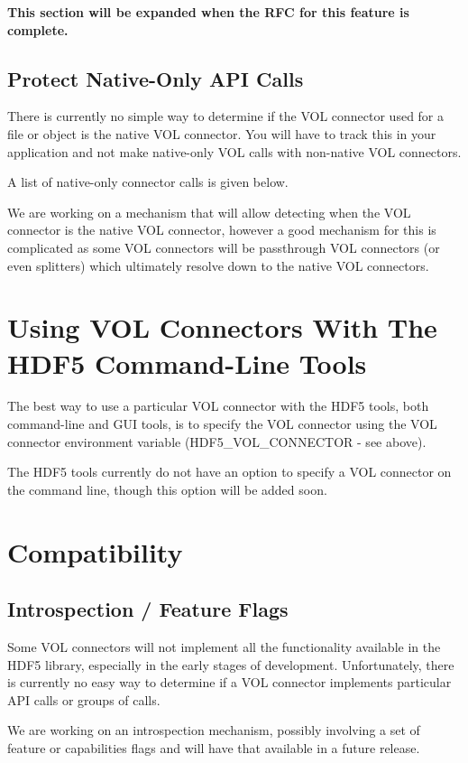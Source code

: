 \textbf{This section will be expanded when the RFC for this feature is complete.}

\subsection{Protect Native-Only API Calls}

There is currently no simple way to determine if the VOL connector used for a file or object is the native VOL connector. You will have to track this in your application and not make native-only VOL calls with non-native VOL connectors.

A list of native-only connector calls is given below.

We are working on a mechanism that will allow detecting when the VOL connector is the native VOL connector, however a good mechanism for this is complicated as some VOL connectors will be passthrough VOL connectors (or even splitters) which ultimately resolve down to the native VOL connectors.

\section{Using VOL Connectors With The HDF5 Command-Line Tools}

The best way to use a particular VOL connector with the HDF5 tools, both command-line and GUI tools, is to specify the VOL connector using the VOL connector environment variable (HDF5\_VOL\_CONNECTOR - see above).

The HDF5 tools currently do not have an option to specify a VOL connector on the command line, though this option will be added soon.

\section{Compatibility}
\subsection{Introspection / Feature Flags}
\thgfuturewarning

Some VOL connectors will not implement all the functionality available in the HDF5 library, especially in the early stages of development. Unfortunately, there is currently no easy way to determine if a VOL connector implements particular API calls or groups of calls.

We are working on an introspection mechanism, possibly involving a set of feature or capabilities flags and will have that available in a future release.

